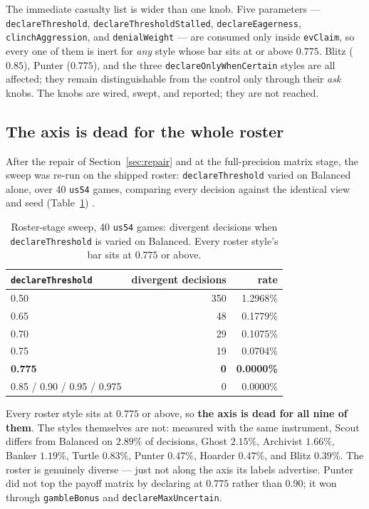 \documentclass[11pt]{article}
\newcommand{\code}[1]{\texttt{#1}}
\begin{document}
The immediate casualty list is wider than one knob. Five parameters ---
\code{declareThreshold}, \code{declareThresholdStalled}, \code{declareEagerness},
\code{clinchAggression}, and \code{denialWeight} --- are consumed only inside \code{evClaim}, so
every one of them is inert for \emph{any} style whose bar sits at or above $0.775$. Blitz
($0.85$), Punter ($0.775$), and the three \code{declareOnlyWhenCertain} styles are all affected;
they remain distinguishable from the control only through their \emph{ask} knobs. The knobs are
wired, swept, and reported; they are not reached.

\subsection{The axis is dead for the whole roster}

After the repair of Section~\ref{sec:repair} and at the full-precision matrix stage, the sweep
was re-run on the shipped roster: \code{declareThreshold} varied on Balanced alone, over 40
\code{us54} games, comparing every decision against the identical view and seed
(Table~\ref{tab:rostersweep}) \cite{styles}.

\begin{table}[ht]
\centering
\caption{Roster-stage sweep, 40 \code{us54} games: divergent decisions when
\code{declareThreshold} is varied on Balanced. Every roster style's bar sits at $0.775$ or
above.}
\label{tab:rostersweep}
\begin{tabular}{lrr}
\toprule
\code{declareThreshold} & divergent decisions & rate \\
\midrule
0.50 & 350 & 1.2968\% \\
0.65 & 48 & 0.1779\% \\
0.70 & 29 & 0.1075\% \\
0.75 & 19 & 0.0704\% \\
\textbf{0.775} & \textbf{0} & \textbf{0.0000\%} \\
0.85 / 0.90 / 0.95 / 0.975 & 0 & 0.0000\% \\
\bottomrule
\end{tabular}
\end{table}

Every roster style sits at $0.775$ or above, so \textbf{the axis is dead for all nine of them}.
The styles themselves are not: measured with the same instrument, Scout differs from Balanced on
$2.89\%$ of decisions, Ghost $2.15\%$, Archivist $1.66\%$, Banker $1.19\%$, Turtle $0.83\%$,
Punter $0.47\%$, Hoarder $0.47\%$, and Blitz $0.39\%$. The roster is genuinely diverse --- just
not along the axis its labels advertise. Punter did not top the payoff matrix by declaring at
$0.775$ rather than $0.90$; it won through \code{gambleBonus} and \code{declareMaxUncertain}.
\end{document}
